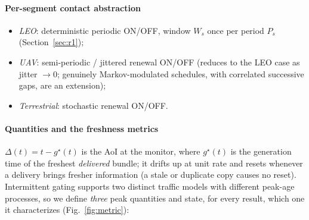 \documentclass[twocolumn,3p,times,procedia]{elsarticle}
\theoremstyle{plain}
\theoremstyle{remark}
\newcommand{\AoI}{\Delta}
\begin{document}
\paragraph*{Per-segment contact abstraction}
\begin{itemize}
\item \emph{LEO}: deterministic periodic ON/OFF, window $W_s$ once per
period $P_s$ (Section~\ref{sec:r1});
\item \emph{UAV}: semi-periodic / jittered renewal ON/OFF (reduces to
the LEO case as jitter $\to 0$; genuinely Markov-modulated schedules,
with correlated successive gaps, are an extension);
\item \emph{Terrestrial}: stochastic renewal ON/OFF.
\end{itemize}

\paragraph*{Quantities and the freshness metrics}
$\AoI(t)=t-g^{\star}(t)$ is the AoI at the monitor, where $g^{\star}(t)$
is the generation time of the freshest \emph{delivered} bundle; it drifts
up at unit rate and resets whenever a delivery brings fresher
information (a stale or duplicate copy causes no reset). Intermittent
gating supports two distinct traffic models with different peak-age
processes, so we define \emph{three} peak quantities and state, for
every result, which one it characterizes (Fig.~\ref{fig:metric}):
\end{document}
